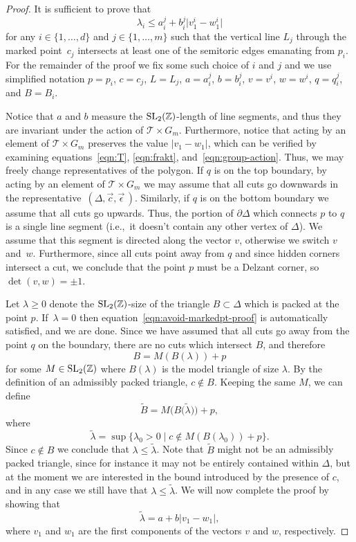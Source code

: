 \documentclass[10pt,a4paper]{amsart}
\numberwithin{equation}{section}
\def\Z{{\mathbb Z}}
\newcommand{\De}{\Delta}
\newcommand{\SL}{{\rm SL}_2(\Z)}
\newcommand{\strep}{(\De,\vec{c},\vec{\epsilon}\,)}
\theoremstyle{definition}
\theoremstyle{plain}
\theoremstyle{plain}
\begin{document}
\begin{proof}
It is sufficient to prove that
\begin{equation}\label{eqn:avoid-markedpt-proof}
 \lambda_i\leq a_i^j + b_i^j \big|v_1^i - w_1^i\big|
\end{equation}
for any $i\in\{1,\ldots, d\}$ and $j\in\{1,\ldots, m\}$ such that the vertical line $L_j$ through the marked point~$c_j$ intersects at least one of the semitoric edges emanating from $p_i$.
For the remainder of the proof we fix some such choice of $i$ and $j$ and we use simplified notation $p=p_i$, $c=c_j$, $L=L_j$, $a = a_i^j$, $b = b_i^j$, $v = v^i$, $w=w^i$, $q=q_i^j$, and $B=B_i$.

Notice that $a$ and $b$ measure the $\SL$-length of line segments, and thus they are invariant under the action of $\mathcal{T}\times G_m$.
Furthermore, notice that acting by an element of $\mathcal{T}\times G_m$ preserves the value $|v_1-w_1|$, which can be verified by examining equations~\eqref{eqn:T}, \eqref{eqn:frakt}, and~\eqref{eqn:group-action}.
Thus, we may freely change representatives of the polygon.
If $q$ is on the top boundary, by acting by an element of $\mathcal{T}\times G_m$ we may assume that all cuts go downwards in the representative~$\strep$.
Similarly, if $q$ is on the bottom boundary we assume that all cuts go upwards.
Thus, the portion of $\partial \De$ which connects $p$ to $q$ is a single line segment (i.e.,~it doesn't contain any other vertex of $\De$).
We assume that this segment is directed along the vector $v$, otherwise we switch $v$ and~$w$.
Furthermore, since all cuts point away from $q$ and since hidden corners intersect a cut, we conclude that the point $p$ must be a Delzant corner, so $\det(v,w) = \pm 1$.

Let $\lambda \geq 0$ denote the $\SL$-size of the triangle $B\subset \De$ which is packed at the point $p$.
If~$\lambda=0$ then equation~\eqref{eqn:avoid-markedpt-proof} is automatically satisfied, and we are done.
Since we have assumed that all cuts go away from the point $q$ on the boundary, there are no cuts which intersect $B$, and therefore
\[
 B = M(B(\lambda))+p
\]
for some $M\in\SL$ where $B(\lambda)$ is the model triangle of size $\lambda$.
By the definition of an admissibly packed triangle, $c\notin B$. Keeping the same $M$, we can define
\[
 \widetilde{B} = M\big(B\big(\widetilde{\lambda}\big)\big)+p,
\]
where
\[
 \widetilde{\lambda} = \sup\{\lambda_0>0 \mid c\notin M(B(\lambda_0))+p\}.
\]
Since $c\notin B$ we conclude that $\lambda\leq \widetilde{\lambda}$.
Note that $\widetilde{B}$ might not be an admissibly packed triangle, since for instance it may not be entirely contained within $\De$, but at the moment we are interested in the bound introduced by the presence of $c$, and in any case we still have that $\lambda\leq \widetilde{\lambda}$.
We will now complete the proof by showing that
\[
 \widetilde{\lambda} = a + b |v_1-w_1|,
\]
where $v_1$ and $w_1$ are the first components of the vectors $v$ and $w$, respectively.


\end{proof}
\end{document}

